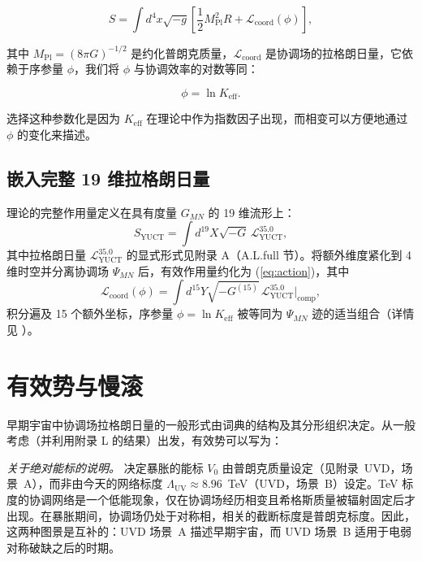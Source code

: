 \documentclass[12pt]{article}
\theoremstyle{remark}
\newcommand{\Keff}{K_{\mathrm{eff}}}
\newcommand{\Mpl}{M_{\mathrm{Pl}}}
\begin{document}
	\begin{equation}
		S = \int d^4x \sqrt{-g} \left[ \frac{1}{2} \Mpl^2 R + \mathcal{L}_{\mathrm{coord}}(\phi) \right],
		\label{eq:action}
	\end{equation}
	
	其中 $\Mpl = (8\pi G)^{-1/2}$ 是约化普朗克质量，$\mathcal{L}_{\mathrm{coord}}$ 是协调场的拉格朗日量，它依赖于序参量 $\phi$，我们将 $\phi$ 与协调效率的对数等同：
	
	\begin{equation}
		\phi = \ln \Keff.
		\label{eq:phi-def}
	\end{equation}
	
	选择这种参数化是因为 $\Keff$ 在理论中作为指数因子出现，而相变可以方便地通过 $\phi$ 的变化来描述。
	
	\subsection{嵌入完整 19 维拉格朗日量}
	
	理论的完整作用量定义在具有度量 $G_{MN}$ 的 19 维流形上：
	\begin{equation}
		S_{\text{YUCT}} = \int d^{19}X \sqrt{-G} \, \mathcal{L}_{\text{YUCT}}^{35.0},
		\label{eq:full-action}
	\end{equation}
	其中拉格朗日量 $\mathcal{L}_{\text{YUCT}}^{35.0}$ 的显式形式见附录 A（A.L.full 节）。将额外维度紧化到 4 维时空并分离协调场 $\Psi_{MN}$ 后，有效作用量约化为 (\ref{eq:action})，其中
	\begin{equation}
		\mathcal{L}_{\mathrm{coord}}(\phi) = \int d^{15}Y \sqrt{-G^{(15)}} \, \mathcal{L}_{\text{YUCT}}^{35.0}\big|_{\text{comp}},
	\end{equation}
	积分遍及 15 个额外坐标，序参量 $\phi = \ln\Keff$ 被等同为 $\Psi_{MN}$ 迹的适当组合（详情见 \cite{Yakushev2026}）。
	
	\section{有效势与慢滚}
	\label{sec:potential}
	
	早期宇宙中协调场拉格朗日量的一般形式由词典的结构及其分形组织决定。从一般考虑（并利用附录 L 的结果）出发，有效势可以写为：
	
	\noindent\textit{关于绝对能标的说明。}
	决定暴胀的能标 $V_0$ 由普朗克质量设定（见附录~UVD，场景~A），而非由今天的网络标度 $\Lambda_{\mathrm{UV}} \approx 8.96$~TeV（UVD，场景~B）设定。TeV 标度的协调网络是一个低能现象，仅在协调场经历相变且希格斯质量被辐射固定后才出现。在暴胀期间，协调场仍处于对称相，相关的截断标度是普朗克标度。因此，这两种图景是互补的：UVD 场景~A 描述早期宇宙，而 UVD 场景~B 适用于电弱对称破缺之后的时期。
	
\end{document}
